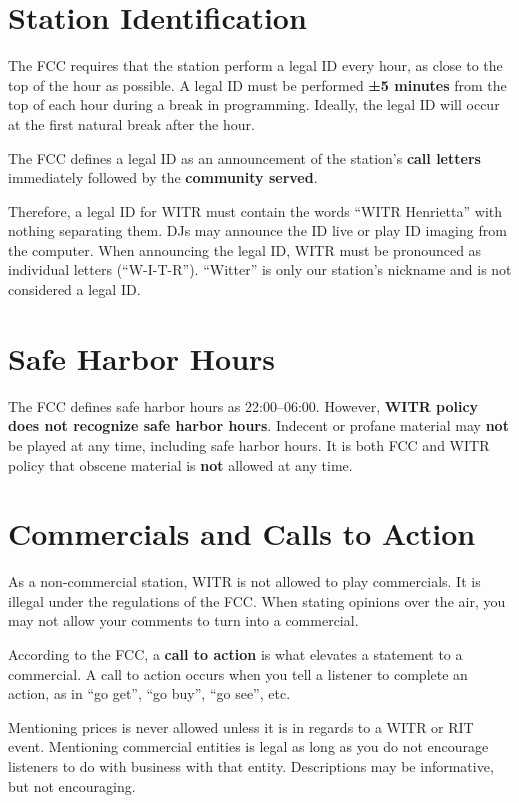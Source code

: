 \documentclass{witrman}
\begin{document}
\section{Station Identification}
The FCC requires that the station perform a legal ID every hour, as close to the
top of the hour as possible. A legal ID must be performed \textbf{±5 minutes}
from the top of each hour during a break in programming. Ideally, the legal ID
will occur at the first natural break after the hour.

The FCC defines a legal ID as an announcement of the station's \textbf{call
letters} immediately followed by the \textbf{community served}.

Therefore, a legal ID for WITR must contain the words ``WITR Henrietta'' with
nothing separating them. DJs may announce the ID live or play ID imaging from
the computer. When announcing the legal ID, WITR must be pronounced as
individual letters (``W-I-T-R''). ``Witter'' is only our station’s nickname and
is not considered a legal ID.

\section{Safe Harbor Hours}
The FCC defines safe harbor hours as 22:00--06:00. However, \textbf{WITR policy
does not recognize safe harbor hours}. Indecent or profane material may
\textbf{not} be played at any time, including safe harbor hours. It is both FCC
and WITR policy that obscene material is \textbf{not} allowed at any time.

\section{Commercials and Calls to Action}
As a non-commercial station, WITR is not allowed to play commercials. It is
illegal under the regulations of the FCC. When stating opinions over the air,
you may not allow your comments to turn into a commercial.

According to the FCC, a \textbf{call to action} is what elevates a statement to
a commercial. A call to action occurs when you tell a listener to complete an
action, as in ``go get'', ``go buy'', ``go see'', etc.

Mentioning prices is never allowed unless it is in regards to a WITR or RIT
event. Mentioning commercial entities is legal as long as you do not encourage
listeners to do with business with that entity. Descriptions may be informative,
but not encouraging.
\end{document}
